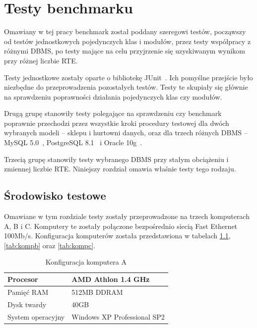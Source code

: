 \chapter{Testy benchmarku}\label{chap:test_bench}

Omawiany w tej pracy benchmark został poddany szeregowi testów, począwszy od testów jednostkowych
pojedynczych klas i modułów, przez testy współpracy z różnymi DBMS, po testy mające na celu przyjrzenie się
uzyskiwanym wynikom przy różnej liczbie RTE. 

Testy jednostkowe zostały oparte o bibliotekę JUnit~\cite{JUnit1}. Ich pomyślne przejście było niezbędne do 
przeprowadzenia pozostałych testów. Testy te skupiały się głównie na sprawdzeniu poprawności działania pojedynczych 
klas czy modułów.

Drugą grupę stanowiły testy polegające na sprawdzeniu czy benchmark poprawnie przechodzi przez wszystkie kroki
procedury testowej dla dwóch wybranych modeli -- sklepu i hurtowni danych, oraz dla trzech różnych DBMS -- MySQL 5.0~\cite{MySql1},
PostgreSQL 8.1~\cite{PostgreSql1} i Oracle 10g~\cite{Oracle1}.

Trzecią grupę stanowiły testy wybranego DBMS przy stałym obciążeniu i zmiennej liczbie RTE. Niniejszy rozdział omawia właśnie
testy tego rodzaju.

\section{Środowisko testowe}
Omawiane w tym rozdziale testy zostały przeprowadzone na trzech komputerach A, B i C. Komputery te zostały połączone 
bezpośrednio siecią Fast Ethernet 100Mb/s. Konfiguracja komputerów została przedstawiona w tabelach \ref{tab:kompa},
\ref{tab:kompb} oraz \ref{tab:kompc}. 

\begin{table}[h]
\caption{Konfiguracja komputera A}\label{tab:kompa}
\begin{center}
\begin{tabular}{|l|l|}
\hline
Procesor&AMD Athlon 1.4 GHz\\
\hline
Pamięć RAM&512MB DDRAM\\
\hline
Dysk twardy&40GB\\
\hline
System operacyjny&Windows XP Professional SP2\\
\hline
\end{tabular}
\end{center}
\end{table}

